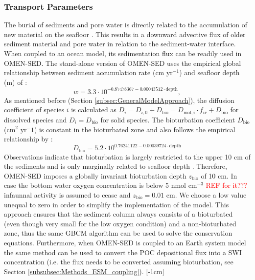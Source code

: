 \documentclass[gmd, manuscript]{copernicus}
\begin{document}
\subsubsection{Transport Parameters}
The burial of sediments and pore water is directly related to the accumulation of new material on the seafloor \citep[i.e. sedimentation,][]{burdige2006geochemistry}. 
This results in a downward advective flux of older sediment material and pore water in relation to the sediment-water interface. When coupled to an ocean model, its sedimentation flux can be readily used in OMEN-SED. 
The stand-alone version of OMEN-SED uses the empirical global relationship between sediment accumulation rate (cm yr$^{-1}$) and seafloor depth (m) of \citet{middelburg_empirical_1997}: 
\begin{equation}
 w = 3.3\cdot 10^{-0.87478367-0.00043512\cdot \text{depth}}\label{eq:sedimentation_rate},
\end{equation}
As mentioned before (Section \ref{subsec:GeneralModelApproach}), the diffusion coefficient of species $i$ is calculated as $D_i=D_{i,0}+D_{\mathrm{bio}}=D_{\mathrm{mol},i}\cdot f_{ir}+D_{\mathrm{bio}}$ for dissolved species and $D_i=D_{\mathrm{bio}}$ for solid species. 
The bioturbation coefficient $D_{\mathrm{bio}}$ (cm$^2$ yr$^-1$) is constant in the bioturbated zone and also follows the empirical relationship by \citet{middelburg_empirical_1997}:
\begin{equation}
 D_{\mathrm{bio}} = 5.2\cdot 10^{0.76241122-0.00039724\cdot \text{depth}}\label{eq:bioturbation_coeff}
\end{equation}
Observations indicate that bioturbation is largely restricted to the upper 10 cm of the sediments and is only marginally related to seafloor depth \citep[e.g.][]{boudreau_mean_1998, teal_global_2010}. 
Therefore, OMEN-SED imposes a globally invariant bioturbation depth $z_{\mathrm{bio}}$ of 10 cm. In case the bottom water oxygen concentration is below 5 nmol cm$^{-3}$ \textcolor{red}{REF for it???}
infaunnal activity is assumed to cease and $z_{\mathrm{bio}} = 0.01$ cm. We choose a low value unequal to zero in order to simplify the implementation of the model. 
This approach ensures that the sediment column always consists of a bioturbated (even though very small for the low oxygen condition) and a non-bioturbated zone, 
thus the same GBCM algorithm can be used to solve the conservation equations. Furthermore, when OMEN-SED is coupled to an Earth system model 
the same method can be used to convert the POC depositional flux into a SWI concentration (i.e. the flux needs to be converted assuming bioturbation, see Section \ref{subsubsec:Methods_ESM_coupling}). 
[-1cm]%
\end{document}
